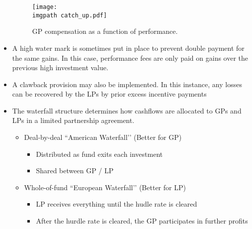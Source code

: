 \documentclass[../notes_compiled.tex]{subfiles}
\begin{document}
\begin{itemize}
{}
\vspace{-.2cm}
\begin{figure}[h]
  \centering
  \texttt{[image: \\imgpath catch\_up.pdf]}
  \caption{GP compensation as a function of performance.}
\end{figure}
\vspace{-.5cm}
\item A high water mark is sometimes put in place to prevent double payment for the same gains. In this case, performance fees are only paid on gains over the previous high investment value.
\item A clawback provision may also be implemented. In this instance, any losses can be recovered by the LPs by prior excess incentive payments
\item The waterfall structure determines how cashflows are allocated to GPs and LPs in a limited partnership agreement.
\begin{itemize}
\item Deal-by-deal ``American Waterfall’’ (Better for GP)
\begin{itemize}
\item Distributed as fund exits each investment
\item Shared between GP / LP
\end{itemize}
\item Whole-of-fund ``European Waterfall’’ (Better for LP)
\begin{itemize}
\item LP receives everything until the hudle rate is cleared
\item After the hurdle rate is cleared, the GP participates in further profits
\end{itemize}
\end{itemize}
\end{itemize}
\end{document}
